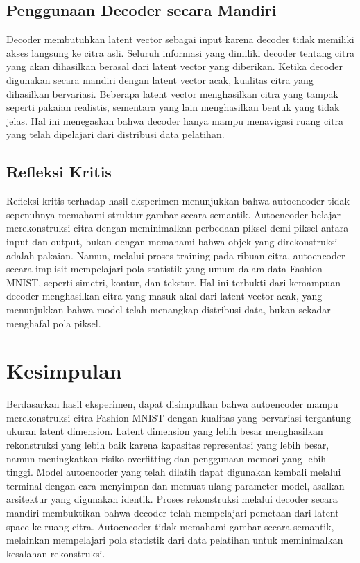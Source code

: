 \documentclass[12pt,a4paper]{article}
\begin{document}
\subsection{Penggunaan Decoder secara Mandiri}

Decoder membutuhkan latent vector sebagai input karena decoder tidak memiliki akses langsung ke citra asli. Seluruh informasi yang dimiliki decoder tentang citra yang akan dihasilkan berasal dari latent vector yang diberikan. Ketika decoder digunakan secara mandiri dengan latent vector acak, kualitas citra yang dihasilkan bervariasi. Beberapa latent vector menghasilkan citra yang tampak seperti pakaian realistis, sementara yang lain menghasilkan bentuk yang tidak jelas. Hal ini menegaskan bahwa decoder hanya mampu menavigasi ruang citra yang telah dipelajari dari distribusi data pelatihan.

\subsection{Refleksi Kritis}

Refleksi kritis terhadap hasil eksperimen menunjukkan bahwa autoencoder tidak sepenuhnya memahami struktur gambar secara semantik. Autoencoder belajar merekonstruksi citra dengan meminimalkan perbedaan piksel demi piksel antara input dan output, bukan dengan memahami bahwa objek yang direkonstruksi adalah pakaian. Namun, melalui proses training pada ribuan citra, autoencoder secara implisit mempelajari pola statistik yang umum dalam data Fashion-MNIST, seperti simetri, kontur, dan tekstur. Hal ini terbukti dari kemampuan decoder menghasilkan citra yang masuk akal dari latent vector acak, yang menunjukkan bahwa model telah menangkap distribusi data, bukan sekadar menghafal pola piksel.

\section{Kesimpulan}

Berdasarkan hasil eksperimen, dapat disimpulkan bahwa autoencoder mampu merekonstruksi citra Fashion-MNIST dengan kualitas yang bervariasi tergantung ukuran latent dimension. Latent dimension yang lebih besar menghasilkan rekonstruksi yang lebih baik karena kapasitas representasi yang lebih besar, namun meningkatkan risiko overfitting dan penggunaan memori yang lebih tinggi. Model autoencoder yang telah dilatih dapat digunakan kembali melalui terminal dengan cara menyimpan dan memuat ulang parameter model, asalkan arsitektur yang digunakan identik. Proses rekonstruksi melalui decoder secara mandiri membuktikan bahwa decoder telah mempelajari pemetaan dari latent space ke ruang citra. Autoencoder tidak memahami gambar secara semantik, melainkan mempelajari pola statistik dari data pelatihan untuk meminimalkan kesalahan rekonstruksi.
\end{document}
